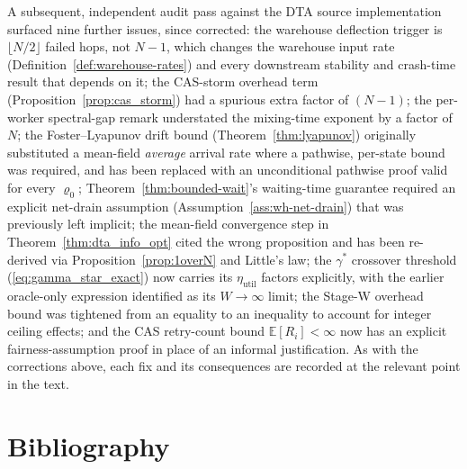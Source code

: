 \documentclass[11pt,a4paper]{article}
\newcommand{\dtact}{\textsc{DTA}}
\begin{document}
A subsequent, independent audit pass against the \dtact{} source
implementation surfaced nine further issues, since corrected: the
warehouse deflection trigger is $\lfloor N/2\rfloor$ failed hops, not
$N-1$, which changes the warehouse input rate
(Definition~\ref{def:warehouse-rates}) and every downstream stability and
crash-time result that depends on it; the CAS-storm overhead term
(Proposition~\ref{prop:cas_storm}) had a spurious extra factor of $(N-1)$; the
per-worker spectral-gap remark understated the mixing-time exponent by
a factor of $N$; the Foster--Lyapunov drift bound
(Theorem~\ref{thm:lyapunov}) originally substituted a mean-field
\emph{average} arrival rate where a pathwise, per-state bound was
required, and has been replaced with an unconditional pathwise proof
valid for every $\varrho_0$; Theorem~\ref{thm:bounded-wait}'s waiting-time
guarantee required an explicit net-drain assumption
(Assumption~\ref{ass:wh-net-drain}) that was previously left implicit;
the mean-field convergence step in
Theorem~\ref{thm:dta_info_opt} cited the wrong proposition and has been
re-derived via Proposition~\ref{prop:1overN} and Little's law; the
$\gamma^*$ crossover threshold (\eqref{eq:gamma_star_exact}) now carries
its $\eta_{\mathrm{util}}$ factors explicitly, with the earlier
oracle-only expression identified as its $W\to\infty$ limit; the Stage-W
overhead bound was tightened from an equality to an inequality to
account for integer ceiling effects; and the CAS retry-count bound
$\mathbb{E}[R_i] < \infty$ now has an explicit fairness-assumption proof
in place of an informal justification. As with the corrections above,
each fix and its consequences are recorded at the relevant point in the
text.

\part*{Bibliography}


\end{document}
